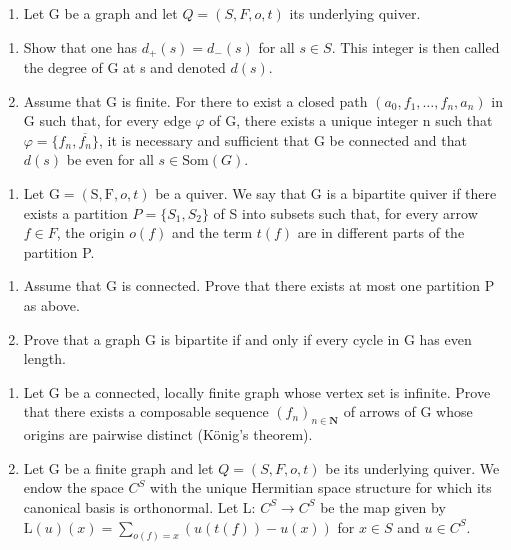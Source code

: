 \exercisegroup

\begin{enumerate}
\def\labelenumi{\arabic{enumi})}
\item
  Let G be a graph and let \(Q = (S, F, o, t)\) its underlying quiver.
\end{enumerate}

\begin{enumerate}
\def\labelenumi{\alph{enumi})}
\item
  Show that one has \(d_{+}(s) = d_{-}(s)\) for all \(s \in S\). This integer is then called the degree of G at s and denoted \(d(s)\).
\item
  Assume that G is finite. For there to exist a closed path \((a_{0}, f_{1}, \ldots, f_{n}, a_{n})\) in G such that, for every edge \(\varphi\) of G, there exists a unique integer n such that \(\varphi = \{f_{n}, \overline{f_{n}}\}\), it is necessary and sufficient that G be connected and that \(d(s)\) be even for all \(s \in \text{Som}(G)\).
\end{enumerate}

\begin{enumerate}
\def\labelenumi{\arabic{enumi})}
\setcounter{enumi}{1}
\tightlist
\item
  Let \(\mathrm{G} = (\mathrm{S}, \mathrm{F}, o, t)\) be a quiver. We say that G is a bipartite quiver if there exists a partition \(P = \{S_{1}, S_{2}\}\) of S into subsets such that, for every arrow \(f \in F\), the origin \(o(f)\) and the term \(t(f)\) are in different parts of the partition P.
\end{enumerate}

\begin{enumerate}
\def\labelenumi{\alph{enumi})}
\item
  Assume that G is connected. Prove that there exists at most one partition P as above.
\item
  Prove that a graph G is bipartite if and only if every cycle in G has even length.
\end{enumerate}

\begin{enumerate}
\def\labelenumi{\arabic{enumi})}
\setcounter{enumi}{2}
\item
  Let G be a connected, locally finite graph whose vertex set is infinite. Prove that there exists a composable sequence \((f_{n})_{n\in\mathbf{N}}\) of arrows of G whose origins are pairwise distinct (König's theorem).
\item
  Let G be a finite graph and let \(Q = (S, F, o, t)\) be its underlying quiver. We endow the space \(C^{S}\) with the unique Hermitian space structure for which its canonical basis is orthonormal. Let L: \(C^{S} \to C^{S}\) be the map given by \(\mathrm{L}(u)(x) = \sum_{o(f)=x} (u(t(f)) - u(x))\) for \(x \in S\) and \(u \in C^{S}\).
\end{enumerate}

